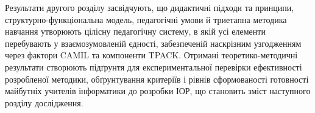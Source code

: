 Результати другого розділу засвідчують, що дидактичні підходи та принципи, структурно-функціональна модель, педагогічні умови й триетапна методика навчання утворюють цілісну педагогічну систему, в якій усі елементи перебувають у взаємозумовленій єдності, забезпеченій наскрізним узгодженням через фактори CAMIL та компоненти TPACK. Отримані теоретико-методичні результати створюють підґрунтя для експериментальної перевірки ефективності розробленої методики, обґрунтування критеріїв і рівнів сформованості готовності майбутніх учителів інформатики до розробки ІОР, що становить зміст наступного розділу дослідження.

